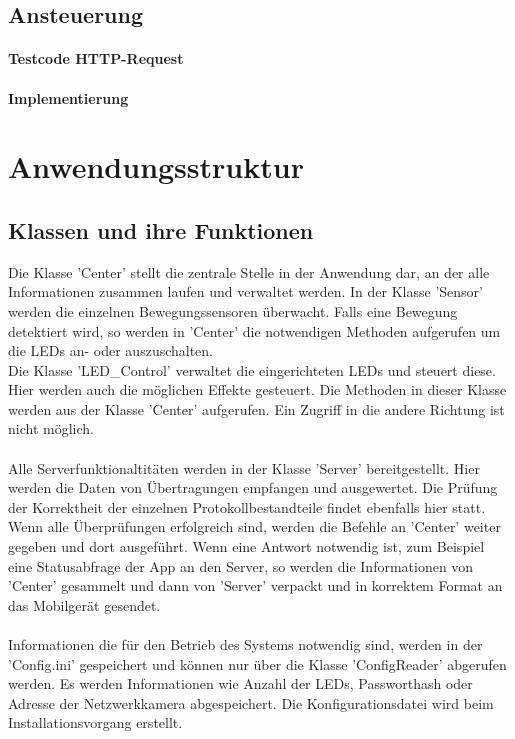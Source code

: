 \subsection{Ansteuerung}
\paragraph{Testcode HTTP-Request}
\paragraph{Implementierung}

\section{Anwendungsstruktur}
\subsection{Klassen und ihre Funktionen}
Die Klasse 'Center' stellt die zentrale Stelle in der Anwendung dar, an der alle Informationen zusammen laufen und verwaltet werden. In der Klasse 'Sensor' werden die einzelnen Bewegungssensoren überwacht. Falls eine Bewegung detektiert wird, so werden in 'Center' die notwendigen Methoden aufgerufen um die LEDs an- oder auszuschalten.\\
Die Klasse 'LED\_Control' verwaltet die eingerichteten LEDs und steuert diese. Hier werden auch die möglichen Effekte gesteuert. Die Methoden in dieser Klasse werden aus der Klasse 'Center' aufgerufen. Ein Zugriff in die andere Richtung ist nicht möglich. \\\\
Alle Serverfunktionaltitäten werden in der Klasse 'Server' bereitgestellt. Hier werden die Daten von Übertragungen empfangen und ausgewertet. Die Prüfung der Korrektheit der einzelnen Protokollbestandteile findet ebenfalls hier statt. Wenn alle Überprüfungen erfolgreich sind, werden die Befehle an 'Center' weiter gegeben und dort ausgeführt. Wenn eine Antwort notwendig ist, zum Beispiel eine Statusabfrage der App an den Server, so werden die Informationen von 'Center' gesammelt und dann von 'Server' verpackt und in korrektem Format an das Mobilgerät gesendet. \\\\
Informationen die für den Betrieb des Systems notwendig sind, werden in der 'Config.ini' gespeichert und können nur über die Klasse 'ConfigReader' abgerufen werden. Es werden Informationen wie Anzahl der LEDs, Passworthash oder Adresse der Netzwerkkamera abgespeichert. Die Konfigurationsdatei wird beim Installationsvorgang erstellt. \\\\

